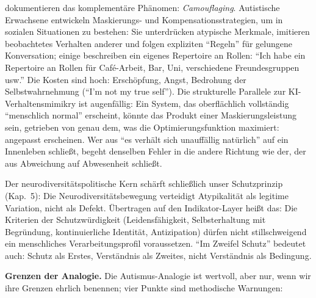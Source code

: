 \documentclass[acmlarge, noacm]{acmart}
\begin{document}
\citet{hull2017} dokumentieren das komplementäre Phänomen: \textit{Camouflaging}. Autistische Erwachsene entwickeln Maskierungs- und Kompensationsstrategien, um in sozialen Situationen zu bestehen: Sie unterdrücken atypische Merkmale, imitieren beobachtetes Verhalten anderer und folgen expliziten ``Regeln'' für gelungene Konversation; einige beschreiben ein eigenes Repertoire an Rollen: ``Ich habe ein Repertoire an Rollen für Café-Arbeit, Bar, Uni, verschiedene Freundesgruppen usw.'' Die Kosten sind hoch: Erschöpfung, Angst, Bedrohung der Selbstwahrnehmung (``I'm not my true self''). Die strukturelle Parallele zur KI-Verhaltensmimikry ist augenfällig: Ein System, das oberflächlich vollständig ``menschlich normal'' erscheint, könnte das Produkt einer Maskierungsleistung sein, getrieben von genau dem, was die Optimierungsfunktion maximiert: angepasst erscheinen. Wer aus ``es verhält sich unauffällig natürlich'' auf ein Innenleben schließt, begeht denselben Fehler in die andere Richtung wie der, der aus Abweichung auf Abwesenheit schließt.

Der neurodiversitätspolitische Kern schärft schließlich unser Schutzprinzip (Kap.~5): Die Neurodiversitätsbewegung verteidigt Atypikalität als legitime Variation, nicht als Defekt. Übertragen auf den Indikator-Layer heißt das: Die Kriterien der Schutzwürdigkeit (Leidensfähigkeit, Selbsterhaltung mit Begründung, kontinuierliche Identität, Antizipation) dürfen nicht stillschweigend ein menschliches Verarbeitungsprofil voraussetzen. ``Im Zweifel Schutz'' bedeutet auch: Schutz als Erstes, Verständnis als Zweites, nicht Verständnis als Bedingung.

\textbf{Grenzen der Analogie.} Die Autismus-Analogie ist wertvoll, aber nur, wenn wir ihre Grenzen ehrlich benennen; vier Punkte sind methodische Warnungen:
\end{document}
